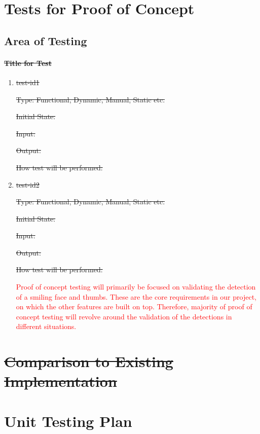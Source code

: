 \documentclass[12pt, titlepage]{article}
\begin{document}
\section{Tests for Proof of Concept}

\subsection{Area of Testing}
		
\paragraph{\sout{Title for Test}}

\begin{enumerate}

\item{\sout{test-id1}\\}

\sout{Type: Functional, Dynamic, Manual, Static etc.}
					
\sout{Initial State: }
					
\sout{Input: }
					
\sout{Output: }
					
\sout{How test will be performed: }
					
\item{\sout{test-id2}\\}

\sout{Type: Functional, Dynamic, Manual, Static etc.}
					
\sout{Initial State: }
					
\sout{Input: }
					
\sout{Output: }
					
\sout{How test will be performed: }

\textcolor{red}{Proof of concept testing will primarily be focused on validating the detection of a smiling face and thumbs. These are the core requirements in our project, on which the other features are built on top. Therefore, majority of proof of concept testing will revolve around the validation of the detections in different situations. }

\end{enumerate}

	
\section{\sout{Comparison to Existing Implementation}}
				
\section{Unit Testing Plan}
		
\end{document}
